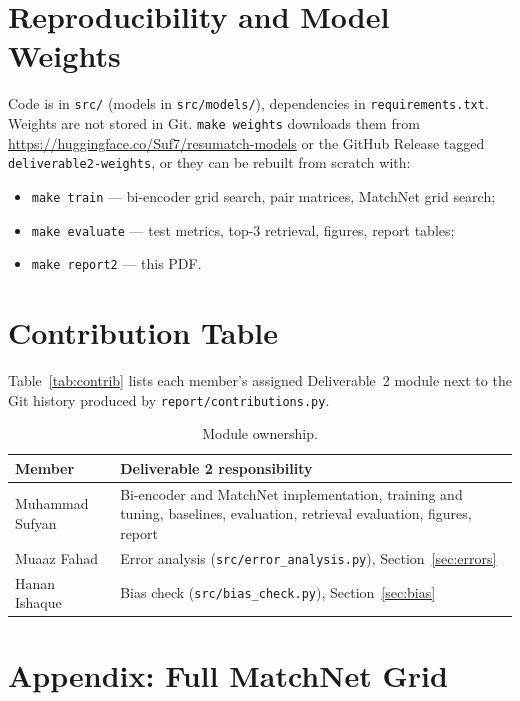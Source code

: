 \documentclass[11pt,a4paper]{article}
\newcommand{\code}[1]{\texttt{\small #1}}
\begin{document}
\section{Reproducibility and Model Weights}\label{sec:repro}
Code is in \code{src/} (models in \code{src/models/}), dependencies in \code{requirements.txt}.
Weights are not stored in Git. \code{make weights} downloads them from
\url{https://huggingface.co/Suf7/resumatch-models}
or the GitHub Release tagged \code{deliverable2-weights},
or they can be rebuilt from scratch with:
\begin{itemize}
\item \code{make train} --- bi-encoder grid search, pair matrices, MatchNet grid search;
\item \code{make evaluate} --- test metrics, top-3 retrieval, figures, report tables;
\item \code{make report2} --- this PDF.
\end{itemize}

\section{Contribution Table}\label{sec:contrib}
Table~\ref{tab:contrib} lists each member's assigned Deliverable~2 module next to the Git history
produced by \code{report/contributions.py}.



\begin{table}[H]
\centering\small
\begin{tabularx}{\linewidth}{@{}l L@{}}
\toprule
Member & Deliverable 2 responsibility\\
\midrule
Muhammad Sufyan & Bi-encoder and MatchNet implementation, training and tuning, baselines, evaluation, retrieval evaluation, figures, report\\
Muaaz Fahad & Error analysis (\code{src/error\_analysis.py}), Section~\ref{sec:errors}\\
Hanan Ishaque & Bias check (\code{src/bias\_check.py}), Section~\ref{sec:bias}\\
\bottomrule
\end{tabularx}
\caption{Module ownership.}
\end{table}

\clearpage
\section{Appendix: Full MatchNet Grid}\label{sec:appendix}

\end{document}
